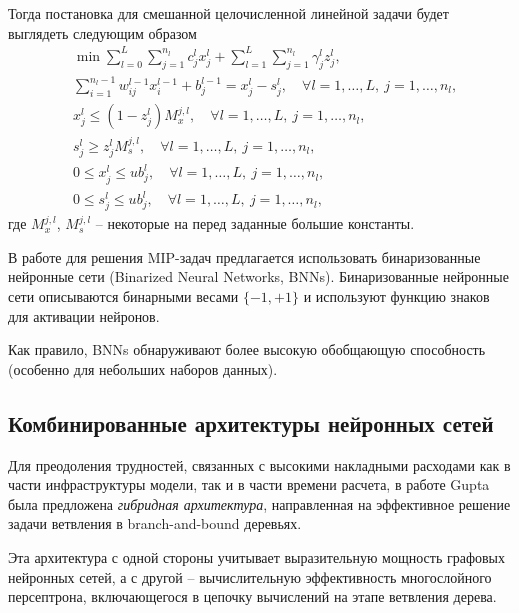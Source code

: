 \documentclass[%
	11pt,
	a4paper,
	utf8,
		]{article}
\begin{document}
Тогда постановка для смешанной целочисленной линейной задачи будет выглядеть следующим образом
\begin{equation*}
	\begin{split}
	&\min \sum_{l=0}^{L} \sum_{j=1}^{n_l} c_j^l x_j^l + \sum_{l=1}^{L}\sum_{j=1}^{n_l} \gamma_j^l z_j^l,\\
	&\sum_{i=1}^{n_l - 1} w_{ij}^{l-1} x_i^{l-1} + b_j^{l-1} = x_j^l - s_j^l, \quad \forall l = 1,\ldots,L, \ j = 1,\ldots,n_l,\\
	&x_j^l \leqslant (1 - z_j^l) M_x^{j,l}, \quad \forall l=1,\ldots,L, \ j = 1,\ldots,n_l,\\
	&s_j^l \geqslant z_j^l M_s^{j,l}, \quad \forall l = 1,\ldots, L, \ j = 1,\ldots, n_l,\\
	&0 \leqslant x_j^l \leqslant ub_j^l, \quad \forall l = 1,\ldots, L, \ j = 1, \ldots, n_l,\\
	&0 \leqslant s_j^l \leqslant u b_j^l, \quad \forall l = 1,\ldots,L, \ j = 1, \ldots, n_l,
	\end{split}
\end{equation*}
где $ M_x^{j,l} $, $ M_s^{j,l} $ -- некоторые на перед заданные большие константы.

В работе \cite{khalil:2018} для решения MIP-задач предлагается использовать бинаризованные нейронные сети (Binarized Neural Networks, BNNs). Бинаризованные нейронные сети описываются бинарными весами $ \{-1, +1\} $ и используют функцию знаков для активации нейронов.

Как правило, BNNs обнаруживают более высокую обобщающую способность (особенно для небольших наборов данных).

\subsection{Комбинированные архитектуры нейронных сетей}

Для преодоления трудностей, связанных с высокими накладными расходами как в части инфраструктуры модели, так и в части времени расчета, в работе Gupta \cite{gupta:hybrid-2020} была предложена \emph{гибридная архитектура}, направленная на эффективное решение задачи ветвления в branch-and-bound деревьях.


Эта архитектура с одной стороны учитывает выразительную мощность графовых нейронных сетей, а с другой -- вычислительную эффективность многослойного персептрона, включающегося в цепочку вычислений на этапе ветвления дерева.
\end{document}
